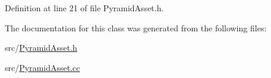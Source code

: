 Definition at line 21 of file Pyramid\+Asset.\+h.



The documentation for this class was generated from the following files\+:\begin{DoxyCompactItemize}
\item 
src/\hyperlink{_pyramid_asset_8h}{Pyramid\+Asset.\+h}\item 
src/\hyperlink{_pyramid_asset_8cc}{Pyramid\+Asset.\+cc}\end{DoxyCompactItemize}
